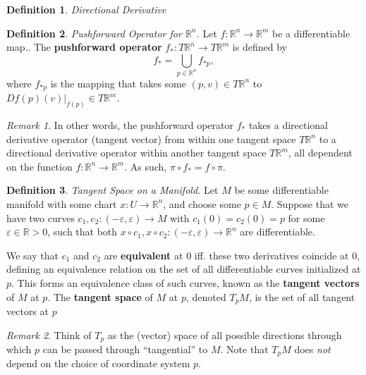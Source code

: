 \documentclass[10pt,landscape]{article}
\theoremstyle{definition}
\newtheorem{definition}{Definition}[section]
\theoremstyle{remark}
\newtheorem*{remark}{Remark}
\newcommand{\R}{\mathbb{R}}
\newcommand{\Rn}{\mathbb{R}^n}
\begin{document}
\begin{multicols*}{3}
\begin{definition}{\textit{Directional Derivative}}
\end{definition}

\begin{definition}{\textit{Pushforward Operator for $\Rn$.}}
Let $f:\Rn\rightarrow\R^m$ be a differentiable map.. The \textbf{pushforward operator} $f_*:T\Rn\rightarrow T\mathbb{R}^m$ is defined by
\begin{equation}
    f_*=\bigcup_{p\in\Rn}f_{*p},
\end{equation}
where $f_{*p}$ is the mapping that takes some $(p, v)\in T\Rn$ to $\left.Df(p)(v)\right|_{f(p)}\in T\R^m$.
\end{definition}

\begin{remark}
In other words, the pushforward operator $f_*$ takes a directional derivative operator (tangent vector) from within one tangent space $T\Rn$ to a directional derivative operator within another tangent space $T\R^m$, all dependent on the function $f:\Rn\rightarrow\R^m$. As such, $\pi\circ f_* = f \circ \pi$.
\end{remark}

\begin{definition}{\textit{Tangent Space on a Manifold.}}
    Let $M$ be some differentiable manifold with some chart $x:U\rightarrow\Rn$, and choose some $p\in M$. Suppose that we have two curves $c_1,c_2:(-\varepsilon,\varepsilon)\rightarrow M$ with $c_1(0)=c_2(0) = p$ for some $\varepsilon\in\R>0$, such that both $x\circ c_1, x\circ c_2:(-\varepsilon,\varepsilon)\rightarrow \Rn$ are differentiable.

    We say that $c_1$ and $c_2$ are \textbf{equivalent} at $0$ iff. these two derivatives coincide at $0$, defining an equivalence relation on the set of all differentiable curves initialized at $p$. This forms an equivalence class of such curves, known as the \textbf{tangent vectors} of $M$ at $p$. The \textbf{tangent space} of $M$ at $p$, denoted $T_pM$, is the set of all tangent vectors at $p$
\end{definition}

\begin{remark}
    Think of $T_p$ as the (vector) space of all possible directions through which $p$ can be passed through ``tangential'' to $M$. Note that $T_pM$ does \textit{not} depend on the choice of coordinate system $p$. 
\end{remark}




\end{multicols*}
\end{document}
